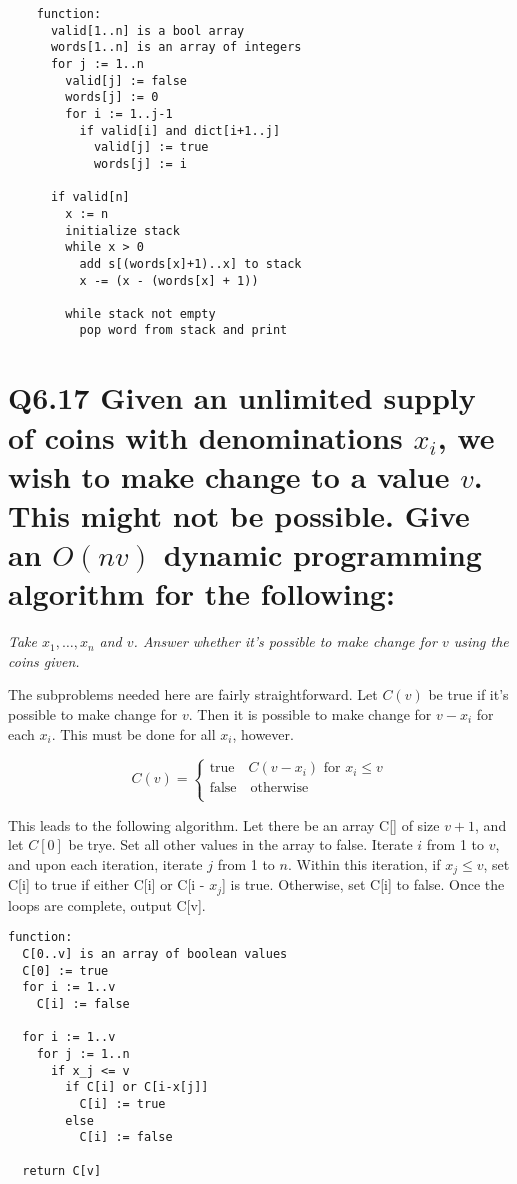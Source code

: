\documentclass{article}
\begin{document}
\begin{enumerate}[(a)]
    \begin{verbatim}
    function:
      valid[1..n] is a bool array
      words[1..n] is an array of integers
      for j := 1..n
        valid[j] := false
        words[j] := 0
        for i := 1..j-1
          if valid[i] and dict[i+1..j]
            valid[j] := true
            words[j] := i

      if valid[n]
        x := n
        initialize stack
        while x > 0
          add s[(words[x]+1)..x] to stack
          x -= (x - (words[x] + 1))
        
        while stack not empty
          pop word from stack and print
    \end{verbatim}
\end{enumerate}

\section*{Q6.17 \normalsize Given an unlimited supply of coins with denominations $x_i$, we wish to make change to a value $v$. This might not be possible. Give an $O(nv)$  dynamic programming algorithm for the following:}

\textit{Take $x_1,\dots,x_n$ and $v$. Answer whether it's possible to make change for $v$ using the coins given.}

\smallskip

The subproblems needed here are fairly straightforward. Let $C(v)$ be true if it's possible to make change for $v$. Then it is possible to make change for $v-x_i$ for each $x_i$. This must be done for all $x_i$, however.

\[
  C(v) =
  \begin{cases}
    \text{true} \quad C(v-x_i) \text{ for } x_i \leq v \\
    \text{false} \quad \text{otherwise} \\
  \end{cases}
\]

This leads to the following algorithm. Let there be an array C[] of size $v+1$, and let $C[0]$ be trye. Set all other values in the array to false. Iterate $i$ from 1 to $v$, and upon each iteration, iterate $j$ from 1 to $n$. Within this iteration, if $x_j \leq v$, set C[i] to true if either C[i] or C[i - $x_j$] is true. Otherwise, set C[i] to false. Once the loops are complete, output C[v].

\begin{verbatim}
function:
  C[0..v] is an array of boolean values
  C[0] := true
  for i := 1..v
    C[i] := false

  for i := 1..v
    for j := 1..n
      if x_j <= v
        if C[i] or C[i-x[j]]
          C[i] := true
        else
          C[i] := false

  return C[v]
\end{verbatim}
\end{document}
